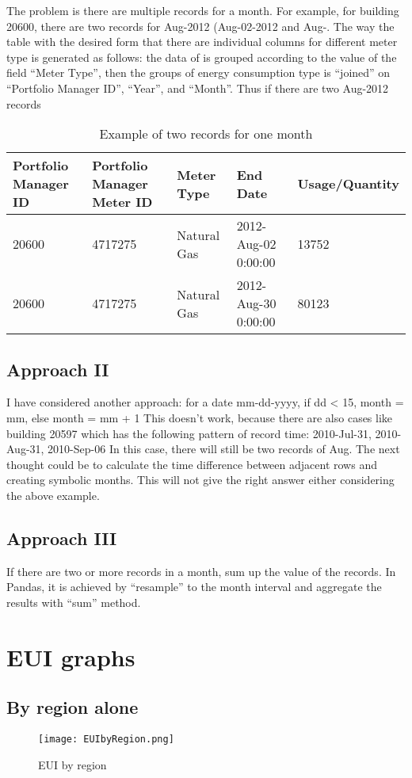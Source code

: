 \documentclass[12pt]{article}
\begin{document}
The problem is there are multiple records for a month. For example,
for building 20600, there are two records for Aug-2012 (Aug-02-2012 and Aug-. The way the
table with the desired form that there are individual columns for
different meter type is generated as follows: the data of is grouped
according to the value of the field ``Meter Type'', then the groups of
energy consumption type is ``joined'' on ``Portfolio Manager ID'', ``Year'', and ``Month''. Thus if there are two Aug-2012 records 
 \begin{table}[h!]
\centering
\caption{Example of two records for one month}
\label{my-label}
\begin{tabular}{p{2cm}p{3cm}lll}
Portfolio Manager ID & Portfolio Manager Meter ID & Meter Type  &  End Date            & Usage/Quantity  \\
  \hline
20600                & 4717275                    & Natural Gas &  2012-Aug-02 0:00:00 & 13752           \\
20600                & 4717275                    & Natural Gas &  2012-Aug-30 0:00:00 & 80123          
\end{tabular}
\end{table}

\subsection{Approach II}
I have considered another approach: for a date mm-dd-yyyy, if dd < 15,
month = mm, else month = mm + 1 This doesn't work, because there are
also cases like building 20597 which has the following pattern of
record time: 2010-Jul-31, 2010-Aug-31, 2010-Sep-06 In this case, there
will still be two records of Aug.  The next thought could be to
calculate the time difference between adjacent rows and creating
symbolic months. This will not give the right answer either
considering the above example.

\subsection{Approach III}
If there are two or more records in a month, sum up the value of the records. In Pandas, it is achieved by ``resample'' to the month interval and aggregate the results with ``sum'' method.

\section{EUI graphs}
\subsection{By region alone}
\begin{figure}[h!]
  \centering
  \texttt{[image: EUIbyRegion.png]}
  \caption{EUI by region}
  \label{fig:EuibyRegion}
\end{figure}
\end{document}
